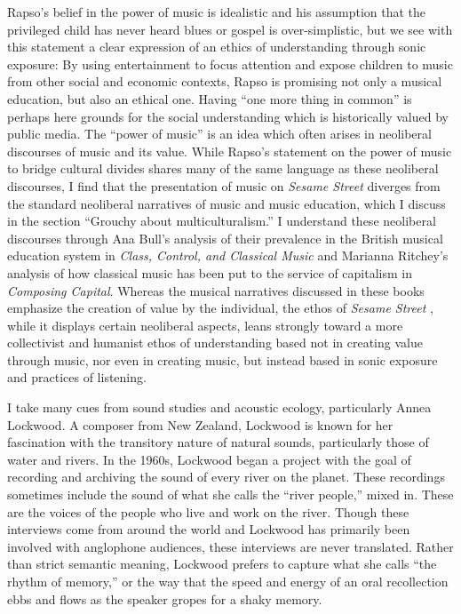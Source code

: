 \documentclass[12pt,letterpaper]{article}
\newcommand{\ses}{\textit{Sesame Street }}
\begin{document}
	Rapso's belief in the power of music is idealistic and his assumption
	that the privileged child has never heard blues or gospel is 
	over-simplistic, but we see with this statement a clear expression of
	an ethics of understanding through sonic exposure: 
	By using entertainment to focus attention and expose children to music 
	from other social and economic contexts,
	Rapso is promising not only a musical education, but also an ethical 
	one. Having ``one more thing in common'' is perhaps here grounds for 
	the social understanding which is historically valued by public media.  
	The ``power of music'' is an idea which often arises in neoliberal 
	discourses of music and its value. While Rapso's statement on the power
	of music to bridge cultural divides shares many of the same language
	as these neoliberal  discourses, I find that the presentation of music
	on \textit{Sesame Street} diverges from the standard neoliberal
	narratives of music and music education, which I discuss in the section
	``Grouchy about multiculturalism.'' I understand these neoliberal
	discourses through
	Ana Bull's analysis of their prevalence in the British musical
	education system in \textit{Class, Control, and Classical Music} and
	Marianna Ritchey's analysis of how classical music has been put to the
	service of capitalism in \textit{Composing Capital}. Whereas the musical
	narratives discussed in these books emphasize the creation of 
	value by the individual, the ethos of \ses, while it displays certain
	neoliberal aspects, leans strongly toward a more collectivist and 
	humanist ethos of understanding based not in creating value through
	music, nor even in creating music, but instead 
	based in sonic exposure and practices of listening.  

	I take many cues from sound studies and acoustic ecology, particularly 
	Annea Lockwood. A composer from New Zealand, Lockwood is known for her 
	fascination with the transitory nature of natural sounds, particularly 
	those of water and rivers. In the 1960s, Lockwood began a project with
	the goal of recording and archiving the sound of every river on the 
	planet.\autocite[117]{Rodgers} These recordings sometimes include the 
	sound of what she calls the ``river people,'' mixed in. These are the 	
	voices of the people who live and work on the 
	river.\autocite[121]{Rodgers} Though these interviews come from around 	
	the world and Lockwood has primarily been involved with anglophone 
	audiences, these interviews are never translated. Rather than strict 
	semantic meaning, Lockwood prefers to capture what she calls ``the 
	rhythm of memory,'' or the way that the speed and energy of an oral 
	recollection ebbs and flows as the speaker gropes for a shaky 
	memory.\autocite[122]{Rodgers}  
\end{document}
